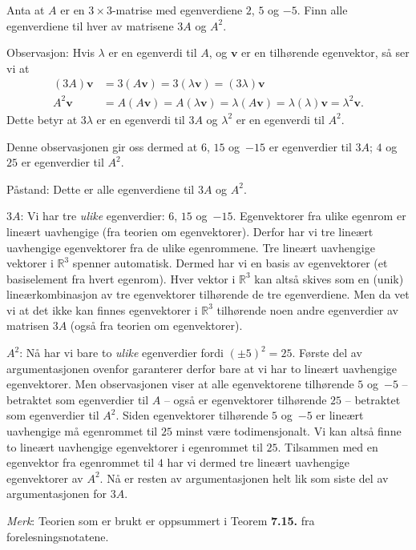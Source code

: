 \documentclass[titlepage,a4paper,12pt,norsk]{IMFeksamen}
\newcommand{\V}[1]{\mathbf{#1}}
\renewcommand{\v}{\V{v}}
\newcommand{\0}{\V{0}}
\begin{document}
\begin{oppgave}
Anta at $A$ er en $3 \times 3$-matrise med egenverdiene $2$, $5$ og $-5$.
Finn alle egenverdiene til hver av matrisene $3A$ og $A^2$.

Observasjon:
Hvis $\lambda$ er en egenverdi til $A$, og $\v$ er en tilhørende egenvektor, så ser vi at
\begin{align*}
(3A)\v&=3(A\v)=3(\lambda\v)=(3\lambda)\v\\
A^2\v&=A(A\v)=A(\lambda \v)=\lambda (A\v)=\lambda(\lambda)\v=\lambda^2 \v.
\end{align*}
Dette betyr at $3\lambda$ er en egenverdi til $3A$ og $\lambda^2$ er en egenverdi til $A^2$. 

Denne observasjonen gir oss dermed at $6$, $15$ og~$-15$ er egenverdier til $3A$; $4$ og~$25$ er egenverdier til $A^2$.

Påstand: Dette er alle egenverdiene til $3A$ og $A^2$.

$3A$: Vi har tre \emph{ulike} egenverdier: $6$, $15$ og~$-15$. Egenvektorer fra ulike egenrom er lineært uavhengige (fra teorien om egenvektorer). Derfor har vi tre lineært uavhengige egenvektorer fra de ulike egenrommene. Tre lineært uavhengige vektorer i $\mathbb{R}^3$ spenner automatisk. Dermed har vi en basis av egenvektorer (et basiselement fra hvert egenrom). Hver vektor i $\mathbb{R}^3$ kan altså skives som en (unik) lineærkombinasjon av tre egenvektorer tilhørende de tre egenverdiene. Men da vet vi at det ikke kan finnes egenvektorer i $\mathbb{R}^3$ tilhørende noen andre egenverdier av matrisen $3A$ (også fra teorien om egenvektorer).

$A^2$: Nå har vi bare to \emph{ulike} egenverdier fordi $(\pm 5)^2=25$. Første del av argumentasjonen ovenfor garanterer derfor bare at vi har to lineært uavhengige egenvektorer. Men observasjonen viser at alle egenvektorene tilhørende $5$ og~$-5$ -- betraktet som egenverdier til $A$ -- også er egenvektorer tilhørende $25$ -- betraktet som egenverdier til $A^2$. Siden egenvektorer tilhørende $5$ og~$-5$ er lineært uavhengige må egenrommet til $25$ minst være todimensjonalt. Vi kan altså finne to lineært uavhengige egenvektorer i egenrommet til $25$. Tilsammen med en egenvektor fra egenrommet til $4$ har vi dermed tre lineært uavhengige egenvektorer av $A^2$. Nå er resten av argumentasjonen helt lik som siste del av argumentasjonen for $3A$.

\emph{Merk}: Teorien som er brukt er oppsummert i Teorem \textbf{7.15.} fra forelesningsnotatene.
\end{oppgave}
\end{document}
